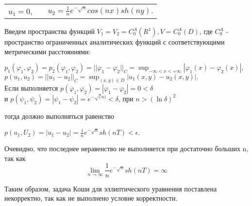 \documentclass[../main.tex]{subfiles}
\begin{document}
\begin{center}
    \begin{tabular}{c c c}
         $u_1=0$, & & $u_2=\frac{1}{n}e^{-\sqrt{n}}cos(nx)sh(ny).$
    \end{tabular}
\end{center}

Введем пространства функций $V_1=V_2=C_0^A(R^1), V=C_0^A(D)$, где $C_0^A$ - пространство ограниченных аналитических функций с соответствующими метрическими расстояниями:
\begin{center}
$p_1(\varphi_1,\varphi_2)=p_2(\varphi_1, \varphi_2) =||\varphi_1-\varphi_2||_C = \sup_{-\infty<x<+\infty}|\varphi_1(x)-\varphi_2(x)|, $\\
$ $\\
$p(u_1, u_2)=||u_1-u_2||_C=\sup_{(x,y) \in D}|u_1(x,y)-u_2(x,y)|.$\\
$ $\\
Если выполняется $p(\varphi_1,\varphi_2)=|\varphi_1-\varphi_2|=0<\delta$\\
$ $\\
и $p(\psi_1,\psi_2)=|\psi_1-\psi_2|=e^{-\sqrt(n)}<\delta$, при $n>(\ln{\delta})^2$ 
\end{center}

тогда должно выполняться равенство

\begin{center}
$p(u_1,U_2)=|u_1-u_2|=\frac{1}{n}e^{-\sqrt{n}}sh(nT)<\epsilon$.
\end{center}

Очевидно, что последнее неравенство не выполняется при достаточно больших n, так как \[\lim_{n \to \infty}{\frac{1}{n}}e^{-\sqrt{n}}sh(nT)=\infty\]

Таким образом, задача Коши для эллиптического уравнения поставлена некорректно, так как не выполнено условие корректности.
\end{document}
